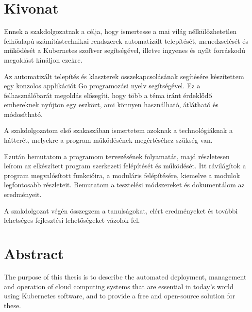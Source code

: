 \setcounter{page}{1}

\selecthungarian

\chapter*{Kivonat}

Ennek a szakdolgozatnak a célja, hogy ismertesse a mai világ nélkülözhetetlen felhőalapú számítástechnikai rendszerek automatizált telepítését, menedzselését és működését a Kubernetes szoftver segítségével, illetve ingyenes és nyílt forráskodú megoldást kínáljon ezekre. 

Az automatizált telepítés és klaszterek összekapcsolásának segítésére készítettem egy konzolos applikációt Go programozási nyelv segítségével. Ez a felhasználóbarát megoldás elősegíti, hogy több a téma iránt érdeklődő embereknek nyújton egy eszközt, ami könnyen használható, átlátható és módosítható.

A szakdolgozatom első szakaszában ismertetem azoknak a technológiáknak a hátterét, melyekre a program működésének megértéséhez szükség van.

Ezután bemutatom a programom tervezésének folyamatát, majd részletesen leírom az elkészített program szerkezeti felépítését és működését. Itt rávilágítok a program megvalósított funkcióira, a moduláris felépítésére, kiemelve a modulok legfontosabb részleteit. Bemutatom a tesztelési módszereket és dokumentálom az eredményeit.

A szakdolgozat végén összegzem a tanulságokat, elért eredményeket és további lehetséges fejlesztési lehetőségeket vázolok fel.

\vfill
\selectenglish


\chapter*{Abstract}

The purpose of this thesis is to describe the automated deployment, management and operation of cloud computing systems that are essential in today's world using Kubernetes software, and to provide a free and open-source solution for these. 

